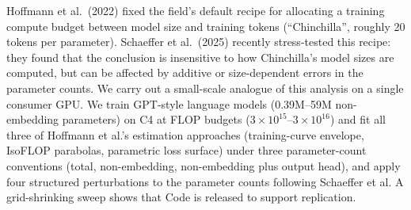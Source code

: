 Hoffmann et al.\ (2022) fixed the field's default recipe for allocating a training compute budget between model size and training tokens (``Chinchilla'', roughly 20 tokens per parameter). Schaeffer et al.\ (2025) recently stress-tested this recipe: they found that the conclusion is insensitive to how Chinchilla's model sizes are computed, but can be affected by additive or size-dependent errors in the parameter counts. We carry out a small-scale analogue of this analysis on a single consumer GPU. We train  GPT-style language models (0.39M--59M non-embedding parameters) on C4 at  FLOP budgets ($3\times10^{15}$--$3\times10^{16}$) and fit all three of Hoffmann et al.'s estimation approaches (training-curve envelope, IsoFLOP parabolas, parametric loss surface) under three parameter-count conventions (total, non-embedding, non-embedding plus output head), and apply four structured perturbations to the parameter counts following Schaeffer et al.   A grid-shrinking sweep shows that  Code is released to support replication.
